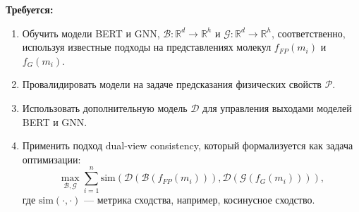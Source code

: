 \textbf{Требуется:}
\begin{enumerate}
  \item Обучить модели BERT и GNN, \( \mathcal{B}: \mathbb{R}^d \rightarrow \mathbb{R}^h \) и \( \mathcal{G}: \mathbb{R}^d \rightarrow \mathbb{R}^h \), соответственно, используя известные подходы на представлениях молекул \( f_{FP}(m_i) \) и \( f_{G}(m_i) \).
  \item Провалидировать модели на задаче предсказания физических свойств \( \mathcal{P} \).
  \item Использовать дополнительную модель \( \mathcal{D} \) для управления выходами моделей BERT и GNN.
  \item Применить подход dual-view consistency, который формализуется как задача оптимизации:
  \[
  \max_{\mathcal{B}, \mathcal{G}} \sum_{i=1}^{n} \text{sim}\left( \mathcal{D}\left(\mathcal{B}\left(f_{FP}(m_i)\right)\right), \mathcal{D}\left(\mathcal{G}\left(f_{G}(m_i)\right)\right) \right),
  \]
  где \( \text{sim}(\cdot, \cdot) \) — метрика сходства, например, косинусное сходство.
\end{enumerate}




\newpage
